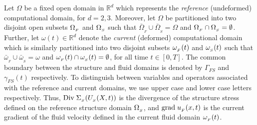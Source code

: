 Let $\Omega$ be a fixed open domain in $\mathbb{R}^d$ which represents
the \emph{reference} (undeformed) computational domain, for
$d=2,3$. Moreover, let $\Omega$ be partitioned into two disjoint open
subsets $\Omega_{_{F}}$ and $\Omega_{_{S}}$ such that
$\bar{\Omega}_{_{F}}\cup\bar{\Omega}_{_{S}} = \Omega$ and
$\Omega_{_{F}}\cap\Omega_{_{S}}=\emptyset$. Further, let $\omega(t)\in\mathbb{R}^d$ denote
the \emph{current} (deformed) computational domain which is similarly
partitioned into two disjoint subsets $\omega_{_{F}}(t)$ and $\omega_{_{S}}(t)$ such that
$\bar{\omega}_{_{F}}\cup\bar{\omega}_{_{S}} = \omega$ and
$\omega_{_{F}}(t)\cap\omega_{_{S}}(t)=\emptyset$, for all time $t\in[0,T]$. The common
boundary between the structure and fluid domains is denoted by
$\Gamma_{FS}$ and $\gamma_{FS}(t)$ respectively. To distinguish
between variables and operators associated with the reference and
current domains, we use upper case and lower case letters
respectively. Thus, $\textrm{Div}\;\Sigma_{_{S}}(U_{_{S}}(X,t))$ is the divergence of the
structure stress defined on the reference structure domain $\Omega_{_{S}}$, and
$\textrm{grad}\;u_{_{F}}(x,t)$ is the current gradient of the fluid velocity defined
in the current fluid domain $\omega_{_{F}}(t)$.

